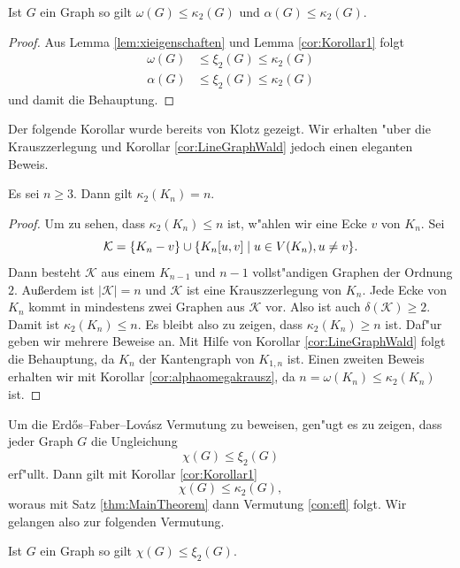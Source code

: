 \begin{corollary}
  Ist $G$ ein Graph so gilt $\omega\left( G \right)\leq \kappa_{2}\left( G \right)$ und $\alpha\left( G \right)\leq \kappa_{2}\left( G \right)$.
  \label{cor:alphaomegakrausz}
\end{corollary}

\begin{proof}
  Aus Lemma \ref{lem:xieigenschaften} und Lemma \ref{cor:Korollar1} folgt
  \begin{align*}
    \omega(G) &\leq \xi_{2}(G) \leq \kappa_{2}(G) \\
    \alpha(G) &\leq \xi_{2}(G) \leq \kappa_{2}(G) 
  \end{align*}
  und damit die Behauptung.
\end{proof}

Der folgende Korollar wurde bereits von Klotz \cite{Klotz89} gezeigt. Wir erhalten "uber die Krauszzerlegung und Korollar \ref{cor:LineGraphWald} jedoch einen eleganten Beweis.
\begin{corollary}[Klotz]
  Es sei $n \geq 3$. Dann gilt $\kappa_{2}\left( K_n \right) = n$.
\end{corollary}

\begin{proof}
  Um zu sehen, dass $\kappa_{2}(K_n) \leq n$ ist, w"ahlen wir eine Ecke $v$ von $K_n$. 
  Sei $$\mathcal{K} = \{ K_n - v\} \cup \{K_n[u,v] \;|\; u\in V(K_n), u\neq v \}.$$ Dann besteht $\mathcal{K}$ aus einem $K_{n-1}$ und $n-1$ vollst"andigen Graphen der Ordnung $2$. 
  Au{\ss}erdem ist $|\mathcal{K}| = n$ und $\mathcal{K}$ ist eine Krauszzerlegung von $K_n$. Jede Ecke von $K_n$ kommt in mindestens zwei Graphen aus $\mathcal{K}$ vor. Also ist auch $\delta(\mathcal{K}) \geq 2$. 
  Damit ist $\kappa_{2}(K_n) \leq n$. Es bleibt also zu zeigen, dass $\kappa_{2}(K_n) \geq n$ ist. Daf"ur geben wir mehrere Beweise an.
  Mit Hilfe von Korollar \ref{cor:LineGraphWald} folgt die Behauptung, da $K_n$ der Kantengraph von $K_{1,n}$ ist.
  Einen zweiten Beweis erhalten wir mit Korollar \ref{cor:alphaomegakrausz}, da $n = \omega(K_n) \leq \kappa_{2}(K_n)$ ist.
\end{proof}


Um die Erd\H{o}s--Faber--Lov\'asz Vermutung zu beweisen, gen"ugt es zu zeigen, dass jeder Graph $G$ die Ungleichung $$\chi(G) \leq \xi_{2}(G)$$ erf"ullt. Dann gilt mit Korollar \ref{cor:Korollar1} $$\chi(G) \leq \kappa_{2}(G),$$  woraus mit Satz \ref{thm:MainTheorem} dann Vermutung \ref{con:efl} folgt. Wir gelangen also zur folgenden Vermutung.
\begin{conjecture}
  Ist $G$ ein Graph so gilt $\chi(G) \leq \xi_{2}(G)$.
  \label{con:maincon}
\end{conjecture}

